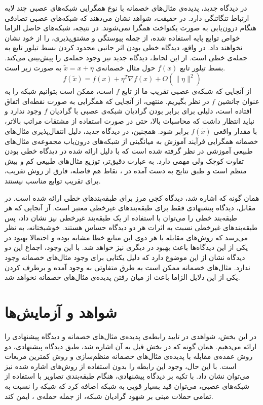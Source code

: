 \documentclass[12pt,onecolumn,a4paper]{article}
\begin{document}
در دیدگاه جدید، پدیده‌ی مثال‌های خصمانه با نوع همگرایی شبکه‌های عصبی چند لایه ارتباط تنگاتنگی دارد. در حقیقت، شواهد نشان می‌دهند که شبکه‌های عصبی تصادفی هنگام درون‌یابی به صورت یکنواخت همگرا نمی‌شوند. در نتیجه، شبکه‌های حاصل الزاما خواص توابع پایه استفاده شده، از جمله پیوستگی و مشتق‌پذیری، را از خود نشان نخواهند داد. در واقع، دیدگاه خطی بودن اثر جانبی محدود کردن بسط تیلور تابع به جمله‌ی خطی است. از این لحاظ، دیدگاه جدید نیز وجود حمله‌ی
را پیش‌بینی می‌کند. بسط تیلور تابع $f(x)$ حول مثال خصمانه‌ی $\tilde{x}=x+\eta$ به صورت زیر است.
\begin{equation*}
f(\tilde{x})=f(x)+\eta^T\nabla f(x) + O(\|\eta\|^2)
\end{equation*}
از آنجایی که شبکه‌ی عصبی تقریب ما از تابع $f$ است، ممکن است بتوانیم شبکه را به عنوان جانشین $f$ در نظر بگیریم. منتهی، از آنجایی که همگرایی به صورت نقطه‌ای اتفاق افتاده است، دلیلی برای برابر بودن گرادیان شبکه‌ی عصبی با گرادیان $f$ وجود ندارد و نباید انتظار داشت که محاسبات بالا، حتی در صورت استفاده از مشتقات مراتب بالاتر، با مقدار واقعی $f(\tilde{x})$ برابر شود. همچنین، در دیدگاه جدید، دلیل انتقال‌پذیری مثال‌های خصمانه همگرایی فرآیند آموزش به میانگینی از شبکه‌های درون‌یاب مجموعه‌ی مثال‌های طبیعی آموزشی در نظر گرفته شده است که با دلیل ارائه شده در دیدگاه خطی بودن تفاوت کوچک ولی مهمی دارد. به عبارت دقیق‌تر، توزیع مثال‌های طبیعی کم و بیش منظم است و طبق نتایج به دست آمده در 
\cite{doi:10.1137/090774707}، 
نقاط هم فاصله، فارق از روش تقریب، برای تقریب توابع مناسب نیستند.

همان گونه که اشاره شد، دیدگاه کجی مرز برای طبقه‌بندهای خطی ارائه شده است. در مقابل، دیدگاه پیشنهادی فقط برای طبقه‌بندهای غیرخطی معتبر است. آز آنجایی که هر طبقه‌بند خطی را می‌توان با استفاده از یک طبقه‌بند غیرخطی نیز نشان داد، پس طبقه‌بندهای غیرخطی نسبت به اثرات هر دو دیدگاه حساس هستند. خوشبختانه، به نظر می‌رسد که روش‌های مقابله با هر دوی این منابع خطا مشابه بوده و احتمالا بهبود در یکی از این دیدگاه‌ها باعث بهبود در دیگری نیز خواهد شد. با این وجود، اجماع این دو دیدگاه نشان از این موضوع دارد که دلیل یکتایی برای وجود مثال‌های خصمانه وجود ندارد. مثال‌های خصمانه ممکن است به طرق متفاوتی به وجود آمده و برطرف کردن یکی از این دلایل الزاما باعث از میان رفتن پدیده‌ی مثال‌های خصمانه نخواهد شد.

\section{شواهد و آزمایش‌ها}
در این بخش، شواهدی در تایید رابطه‌ی پدیده‌ی مثال‌های خصمانه و دیدگاه پیشنهادی را ارائه می‌دهیم. همان گونه که در بخش قبل به آن اشاره شد، طبق دیدگاه پیشنهادی، دو روش عمده‌ی مقابله با پدیده‌ی مثال‌های خصمانه منظم‌سازی و روش کمترین مربعات است. با این  حال، وجود این رابطه را بدون استفاده از روش‌های اشاره شده نیز می‌توان نشان داد. با تکیه بر دیدگاه پیشنهادی، هنگام طبقه‌بندی تصاویر با استفاده از شبکه‌های عصبی، می‌توان قید بسیار قویی به شبکه اضافه کرد که شبکه را نسبت به تمامی حملات مبنی بر شهود گرادیان  شبکه، از جمله حمله‌ی ، ایمن کند.
\end{document}
